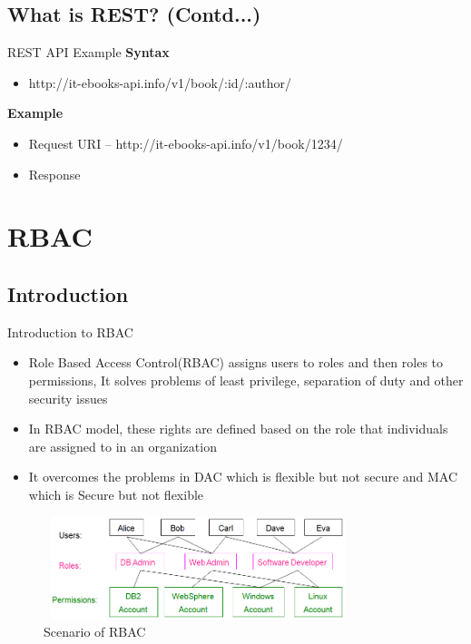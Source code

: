 \documentclass[xcolor=dvipsnames]{beamer}
\begin{document}
\subsection{What is REST? (Contd...)}
\begin{frame}{REST API Example}
\textbf{Syntax}
\begin{itemize}
	\item http://it-ebooks-api.info/v1/book/:id/:author/
\end{itemize}
\textbf{Example}
\begin{itemize}
	\item Request URI -- http://it-ebooks-api.info/v1/book/1234/
	\item Response 
\end{itemize}


\end{frame}

\section{RBAC}
\subsection{Introduction}
\begin{frame}{Introduction to RBAC}
\begin{itemize}
 \item Role Based Access Control(RBAC) assigns users to roles and then roles to permissions, It solves problems of least privilege, separation of duty and other security issues
 \item In RBAC model, these rights are defined based on the role that individuals are assigned to in an organization
 \item It overcomes the problems in DAC which is flexible but not secure and MAC which is Secure but not flexible
\end{itemize}
\begin{figure}[H]
\includegraphics[width=9cm,height=3cm]{sunny1}
\caption{Scenario of RBAC\label{fig:Scenario of RBAC}}
\end{figure}
\end{frame}
\end{document}
